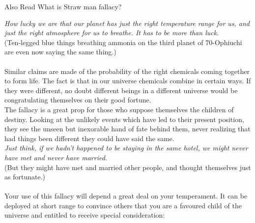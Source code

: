 \documentclass[a4paper,12pt,single,pdftex]{scrartcl}
\begin{document}
    
      

      
        Also Read  What is Straw man fallacy?
      
    
    
      {\em How lucky we are that our planet has just the right temperature range for us, and just the right atmosphere for us to breathe. It has to be more than luck.}
    \\

    
      (Ten-legged blue things breathing ammonia on the third planet of 70-Ophiuchi are even now saying the same thing.)
    \\

    
       
    \\

    
      Similar claims are made of the probability of the right chemicals coming together to form life. The fact is that in our universe chemicals combine in certain ways. If they were different, no doubt different beings in a different universe would be congratulating themselves on their good fortune.
    \\

    
      The fallacy is a great prop for those who suppose themselves the children of destiny. Looking at the unlikely events which have led to their present position, they see the unseen but inexorable hand of fate behind them, never realizing that had things been different they could have said the same.
    \\

    
      {\em Just think, if we hadn’t happened to be staying in the same hotel, we might never have met and never have married.}
    \\

    
      (But they might have met and married other people, and thought themselves just as fortunate.)
    \\

    
       
    \\

    
      Your use of this fallacy will depend a great deal on your temperament. It can be deployed at short range to convince others that you are a favoured child of the universe and entitled to receive special consideration:
    \\

    
       
    \\
\end{document}
